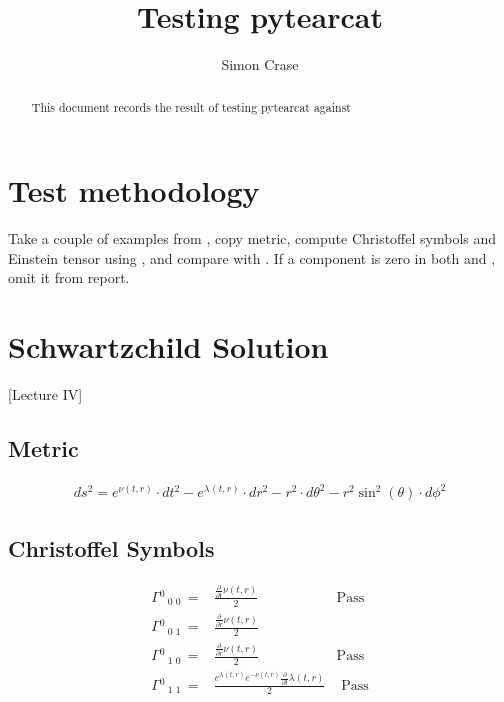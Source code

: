 \documentclass[]{article}
\title{Testing pytearcat}
\author{Simon Crase}
\begin{document}
\maketitle

\begin{abstract}
This document records the result of testing pytearcat\cite{san2021pytearcat} against \cite{akhmedov2016lectures}
\end{abstract}

\tableofcontents

\section{Test methodology}

Take a couple of examples from \cite{akhmedov2016lectures}, copy metric, compute Christoffel symbols and Einstein tensor using , and compare with \cite{akhmedov2016lectures}. If a component is zero in both \cite{akhmedov2016lectures} and \cite{san2021pytearcat}, omit it from report.
\section{Schwartzchild Solution}

\cite{akhmedov2016lectures}[Lecture IV]

\subsection{Metric}
\begin{align*}
	ds^2 = e^{\nu{\left(t,r \right)}} \cdot dt^2- e^{\lambda_{}{\left(t,r \right)}} \cdot dr^2- r^{2} \cdot d\theta^2- r^{2} \sin^{2}{\left(\theta \right)} \cdot d\phi^2
\end{align*}

\subsection{Christoffel Symbols}

\begin{align*}
	{\Gamma}{}^{0}\,{}_{0}\,{}_{0}\, =& \frac{\frac{\partial}{\partial t} \nu{\left(t,r \right)}}{2}  & \text{Pass} \\
	{\Gamma}{}^{0}\,{}_{0}\,{}_{1}\, =& \frac{\frac{\partial}{\partial r} \nu{\left(t,r \right)}}{2}\\
	{\Gamma}{}^{0}\,{}_{1}\,{}_{0}\, =& \frac{\frac{\partial}{\partial r} \nu{\left(t,r \right)}}{2} & \text{Pass}\\	
	{\Gamma}{}^{0}\,{}_{1}\,{}_{1}\, =& \frac{e^{\lambda_{}{\left(t,r \right)}} e^{- \nu{\left(t,r \right)}} \frac{\partial}{\partial t} \lambda_{}{\left(t,r \right)}}{2} & \text{ Pass}
\end{align*}
\end{document}
